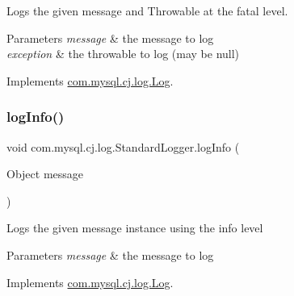 Logs the given message and Throwable at the \textquotesingle{}fatal\textquotesingle{} level.


\begin{DoxyParams}{Parameters}
{\em message} & the message to log \\
\hline
{\em exception} & the throwable to log (may be null) \\
\hline
\end{DoxyParams}


Implements \mbox{\hyperlink{interfacecom_1_1mysql_1_1cj_1_1log_1_1_log_a54cd5e19bf210ab86b373400e2213229}{com.\+mysql.\+cj.\+log.\+Log}}.

\mbox{\label{classcom_1_1mysql_1_1cj_1_1log_1_1_standard_logger_aeeb1226e65e7183722939e8ae666a910}} 
\subsubsection{\texorpdfstring{log\+Info()}{logInfo()}\hspace{0.1cm}{\footnotesize\ttfamily [1/2]}}
{\footnotesize\ttfamily void com.\+mysql.\+cj.\+log.\+Standard\+Logger.\+log\+Info (\begin{DoxyParamCaption}\item[{Object}]{message }\end{DoxyParamCaption})}

Logs the given message instance using the \textquotesingle{}info\textquotesingle{} level


\begin{DoxyParams}{Parameters}
{\em message} & the message to log \\
\hline
\end{DoxyParams}


Implements \mbox{\hyperlink{interfacecom_1_1mysql_1_1cj_1_1log_1_1_log_a7f117433067520dd682da12ff9194f4b}{com.\+mysql.\+cj.\+log.\+Log}}.

\mbox{\label{classcom_1_1mysql_1_1cj_1_1log_1_1_standard_logger_a9086549846486165e052a7e1ce190864}} 
